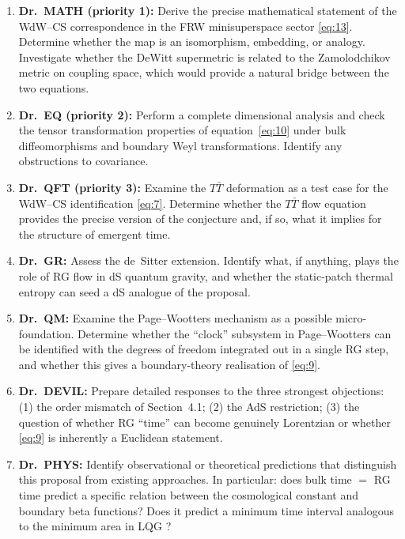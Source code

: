 \documentclass[11pt,a4paper]{article}
\begin{document}
\begin{enumerate}
  \item \textbf{Dr.\ MATH (priority 1):}
    Derive the precise mathematical statement of the WdW--CS correspondence
    in the FRW minisuperspace sector \eqref{eq:13}.
    Determine whether the map is an isomorphism, embedding, or analogy.
    Investigate whether the DeWitt supermetric is related to the Zamolodchikov
    metric on coupling space, which would provide a natural bridge between the
    two equations.

  \item \textbf{Dr.\ EQ (priority 2):}
    Perform a complete dimensional analysis and check the tensor transformation
    properties of equation~\eqref{eq:10} under bulk diffeomorphisms and
    boundary Weyl transformations.
    Identify any obstructions to covariance.

  \item \textbf{Dr.\ QFT (priority 3):}
    Examine the $T\bar{T}$ deformation as a test case for the
    WdW--CS identification \eqref{eq:7}.
    Determine whether the $T\bar{T}$ flow equation provides the precise
    version of the conjecture and, if so, what it implies for the structure
    of emergent time.

  \item \textbf{Dr.\ GR:}
    Assess the de~Sitter extension.
    Identify what, if anything, plays the role of RG flow in dS quantum
    gravity, and whether the static-patch thermal entropy can seed a dS
    analogue of the proposal.

  \item \textbf{Dr.\ QM:}
    Examine the Page--Wootters mechanism as a possible micro-foundation.
    Determine whether the ``clock'' subsystem in Page--Wootters can be
    identified with the degrees of freedom integrated out in a single RG step,
    and whether this gives a boundary-theory realisation of \eqref{eq:9}.

  \item \textbf{Dr.\ DEVIL:}
    Prepare detailed responses to the three strongest objections:
    (1) the order mismatch of Section~4.1;
    (2) the AdS restriction;
    (3) the question of whether RG ``time'' can become genuinely Lorentzian
    or whether \eqref{eq:9} is inherently a Euclidean statement.

  \item \textbf{Dr.\ PHYS:}
    Identify observational or theoretical predictions that distinguish this
    proposal from existing approaches.
    In particular: does bulk time $=$ RG time predict a specific relation
    between the cosmological constant and boundary beta functions?
    Does it predict a minimum time interval analogous to the minimum area
    in LQG \cite{ashtekar2004}?


\end{enumerate}
\end{document}
